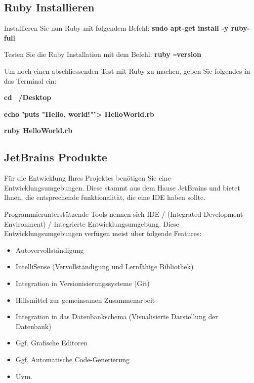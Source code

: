 \subsection{Ruby Installieren}\label{subsec:rubyinstallieren}
\begin{frame}[fragile]
    Installieren Sie nun Ruby mit folgendem Befehl: \textbf{sudo apt-get install -y ruby-full}

    Testen Sie die Ruby Installation mit dem Befehl: \textbf{ruby \texttt{--}version}

    Um noch einen abschliessenden Test mit Ruby zu machen, geben Sie folgendes in das Terminal ein:
    \vSpaceStyle{0.1em}

    \textbf{cd ~/Desktop}
    \vSpaceStyle{0.1em}

    \textbf{echo 'puts "Hello, world!"\space\textquoteright > HelloWorld.rb}
    \vSpaceStyle{0.1em}

    \textbf{ruby HelloWorld.rb}
\end{frame}

\subsection{JetBrains Produkte}\label{subsec:jetbrains}
\begin{frame}[fragile]
    Für die Entwicklung Ihres Projektes benötigen Sie eine Entwicklungsumgebungen.
    Diese stammt aus dem Hause JetBrains und bietet Ihnen, die entsprechende funktionalität, die eine IDE haben sollte.

    Programmierunterstützende Tools nennen sich IDE / (Integrated Development Environment) /
    Integrierte Entwicklungsumgebung.
    Diese Entwicklungsumgebungen verfügen meist über folgende Features:
    \begin{itemize}
        \item Autovervollständigung
        \item IntelliSense (Vervollständigung und Lernfähige Bibliothek)
        \item Integration in Versionisierungssysteme (Git)
        \item Hilfsmittel zur gemeinsamen Zusammenarbeit
        \item Integration in das Datenbankschema (Visualisierte Darstellung der Datenbank)
        \item Ggf. Grafische Editoren
        \item Ggf. Automatische Code-Generierung
        \item Uvm.
    \end{itemize}
\end{frame}

